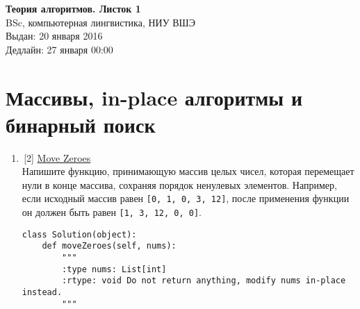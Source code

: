\documentclass[12pt,a4paper]{report}
\begin{document}
\begin{center}
\textbf{\LARGE{Теория алгоритмов. Листок 1}}\\
BSc, компьютерная лингвистика, НИУ ВШЭ\\
Выдан: 20 января 2016\\
Дедлайн: 27 января 00:00\\
\end{center}


% 









% 




\section{Массивы, in-place алгоритмы и бинарный поиск}

\begin{enumerate}

  \item\,[2] \href{https://leetcode.com/problems/move-zeroes/}{Move Zeroes}\\
  Напишите функцию, принимающую массив целых чисел, которая перемещает нули в конце массива, сохраняя порядок ненулевых элементов.
  Например, если исходный массив равен \texttt{[0, 1, 0, 3, 12]}, после применения функции он должен быть равен \texttt{[1, 3, 12, 0, 0]}.

  \begin{verbatim}
class Solution(object):
    def moveZeroes(self, nums):
        """
        :type nums: List[int]
        :rtype: void Do not return anything, modify nums in-place instead.
        """
  \end{verbatim}     


\end{enumerate}
\end{document}
